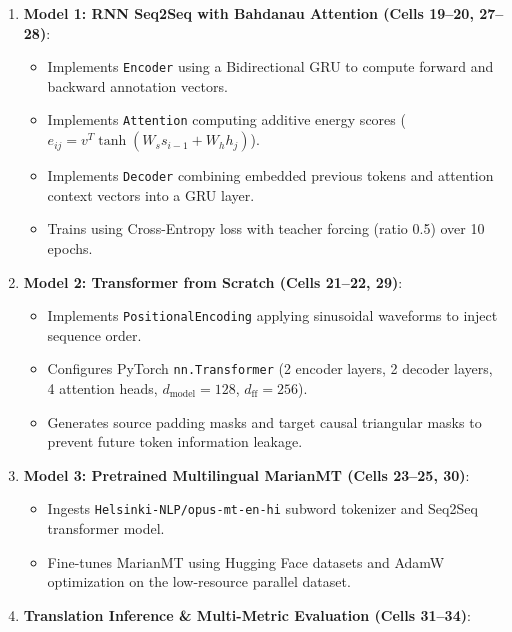 \documentclass[12pt,a4paper,oneside]{report}
\providecommand{\tightlist}{\setlength{\itemsep}{0pt}\setlength{\parskip}{0pt}}
\begin{document}
\begin{enumerate}
  \begin{itemize}
  \tightlist
  \item
    Implements a custom \texttt{Vocabulary} class managing \texttt{\textless{}pad\textgreater{}}, \texttt{\textless{}sos\textgreater{}}, \texttt{\textless{}eos\textgreater{}}, and \texttt{\textless{}unk\textgreater{}} special tokens with frequency filtering (\texttt{min\_freq=2}).
  \item
    Constructs a custom PyTorch \texttt{TranslationDataset} with dynamic padding for batch execution.
  \end{itemize}
\item
  \textbf{Model 1: RNN Seq2Seq with Bahdanau Attention (Cells 19--20, 27--28)}:

  \begin{itemize}
  \tightlist
  \item
    Implements \texttt{Encoder} using a Bidirectional GRU to compute forward and backward annotation vectors.
  \item
    Implements \texttt{Attention} computing additive energy scores (\(e_{ij} = v^T \tanh(W_s s_{i-1} + W_h h_j)\)).
  \item
    Implements \texttt{Decoder} combining embedded previous tokens and attention context vectors into a GRU layer.
  \item
    Trains using Cross-Entropy loss with teacher forcing (ratio 0.5) over 10 epochs.
  \end{itemize}
\item
  \textbf{Model 2: Transformer from Scratch (Cells 21--22, 29)}:

  \begin{itemize}
  \tightlist
  \item
    Implements \texttt{PositionalEncoding} applying sinusoidal waveforms to inject sequence order.
  \item
    Configures PyTorch \texttt{nn.Transformer} (2 encoder layers, 2 decoder layers, 4 attention heads, \(d_{\text{model}}=128\), \(d_{\text{ff}}=256\)).
  \item
    Generates source padding masks and target causal triangular masks to prevent future token information leakage.
  \end{itemize}
\item
  \textbf{Model 3: Pretrained Multilingual MarianMT (Cells 23--25, 30)}:

  \begin{itemize}
  \tightlist
  \item
    Ingests \texttt{Helsinki-NLP/opus-mt-en-hi} subword tokenizer and Seq2Seq transformer model.
  \item
    Fine-tunes MarianMT using Hugging Face datasets and AdamW optimization on the low-resource parallel dataset.
  \end{itemize}
\item
  \textbf{Translation Inference \& Multi-Metric Evaluation (Cells 31--34)}:


\end{enumerate}
\end{document}

